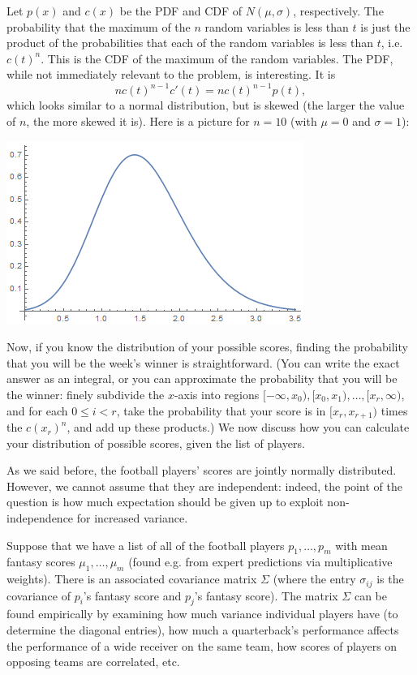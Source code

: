 \documentclass[12pt, final, onecolumn, titlepage]{article}
\theoremstyle{definition}
\begin{document}
Let $p(x)$ and $c(x)$ be the PDF and CDF of $N(\mu, \sigma)$, respectively. The probability that the maximum of the $n$ random variables is less than $t$ is just the product of the probabilities that each of the random variables is less than $t$, i.e. $c(t)^n$. This is the CDF of the maximum of the random variables. The PDF, while not immediately relevant to the problem, is interesting. It is
\[nc(t)^{n - 1}c'(t) = nc(t)^{n - 1}p(t),\]
which looks similar to a normal distribution, but is skewed (the larger the value of $n$, the more skewed it is). Here is a picture for $n = 10$ (with $\mu = 0$ and $\sigma = 1$):
\begin{center}
\includegraphics[scale=0.7]{Maximum_Distribution_N=10.png}
\end{center}

Now, if you know the distribution of your possible scores, finding the probability that you will be the week's winner is straightforward. (You can write the exact answer as an integral, or you can approximate the probability that you will be the winner: finely subdivide the $x$-axis into regions $[-\infty, x_0), [x_0, x_1), \dots, [x_r, \infty)$, and for each $0 \le i < r$, take the probability that your score is in $[x_r, x_{r + 1})$ times the $c(x_r)^n$, and add up these products.) We now discuss how you can calculate your distribution of possible scores, given the list of players.

As we said before, the football players' scores are jointly normally distributed. However, we cannot assume that they are independent: indeed, the point of the question is how much expectation should be given up to exploit non-independence for increased variance.

Suppose that we have a list of all of the football players $p_1, \dots, p_m$ with mean fantasy scores $\mu_1, \dots, \mu_m$ (found e.g. from expert predictions via multiplicative weights). There is an associated covariance matrix $\Sigma$ (where the entry $\sigma_{ij}$ is the covariance of $p_i$'s fantasy score and $p_j$'s fantasy score). The matrix $\Sigma$ can be found empirically by examining how much variance individual players have (to determine the diagonal entries), how much a quarterback's performance affects the performance of a wide receiver on the same team, how scores of players on opposing teams are correlated, etc.
\end{document}
